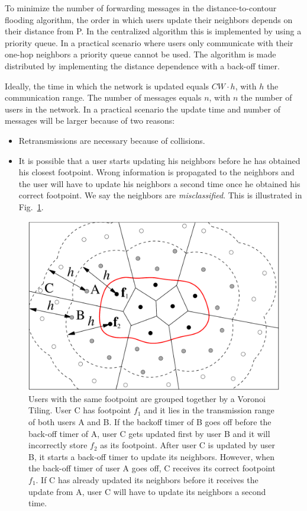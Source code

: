 To minimize the number of forwarding messages in the distance-to-contour flooding algorithm, the order in which users update their neighbors depends on their distance from P. In the centralized algorithm this is implemented by using a priority queue. In a practical scenario where users only communicate with their one-hop neighbors a priority queue cannot be used. The algorithm is made distributed by implementing the distance dependence with a back-off timer. 

Ideally, the time in which the network is updated equals $CW \cdot h$, with $h$ the communication range. The number of messages equals $n$, with $n$ the number of users in the network. In a practical scenario the update time and number of messages will be larger because of two reasons: 
 
\begin{itemize}
 \item Retransmissions are necessary because of collisions.
\item It is possible that a user starts updating his neighbors before he has obtained his closest footpoint. Wrong information is propagated to the neighbors and the user will have to update his neighbors a second time once he obtained his correct footpoint. We say the neighbors are \textit{misclassified}. This is illustrated in Fig.~\ref{fig:misclass}.
\end{itemize}

\begin{figure}
\centering
\includegraphics[scale=0.25]{figures/algorithm/proof2}
\caption{\label{fig:misclass}\cite{sofie} Users with the same footpoint are grouped together by a Voronoi Tiling. User C has footpoint $f_1$ and it lies in the transmission range of both users A and B. If the backoff timer of B goes off before the back-off timer of A, user C gets updated first by user B and it will incorrectly store $f_2$ as its footpoint. After user C is updated by user B, it starts a back-off timer to update its neighbors. However, when the back-off timer of user A goes off, C receives its correct footpoint $f_1$. If C has already updated its neighbors before it receives the update from A, user C will have to update its neighbors a second time.}
\end{figure}

